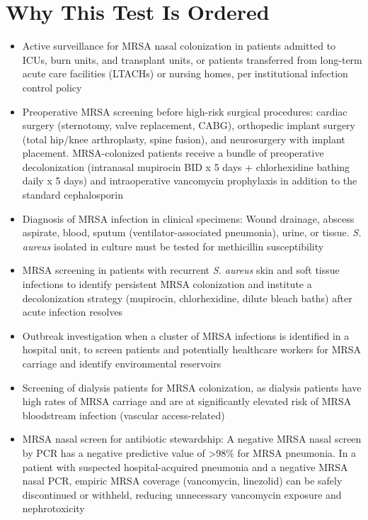 \section*{Why This Test Is Ordered}
\begin{itemize}
  \item Active surveillance for MRSA nasal colonization in patients admitted to ICUs, burn units, and transplant units, or patients transferred from long-term acute care facilities (LTACHs) or nursing homes, per institutional infection control policy
  \item Preoperative MRSA screening before high-risk surgical procedures: cardiac surgery (sternotomy, valve replacement, CABG), orthopedic implant surgery (total hip/knee arthroplasty, spine fusion), and neurosurgery with implant placement. MRSA-colonized patients receive a bundle of preoperative decolonization (intranasal mupirocin BID x 5 days + chlorhexidine bathing daily x 5 days) and intraoperative vancomycin prophylaxis in addition to the standard cephalosporin
  \item Diagnosis of MRSA infection in clinical specimens: Wound drainage, abscess aspirate, blood, sputum (ventilator-associated pneumonia), urine, or tissue. \textit{S. aureus} isolated in culture must be tested for methicillin susceptibility
  \item MRSA screening in patients with recurrent \textit{S. aureus} skin and soft tissue infections to identify persistent MRSA colonization and institute a decolonization strategy (mupirocin, chlorhexidine, dilute bleach baths) after acute infection resolves
  \item Outbreak investigation when a cluster of MRSA infections is identified in a hospital unit, to screen patients and potentially healthcare workers for MRSA carriage and identify environmental reservoirs
  \item Screening of dialysis patients for MRSA colonization, as dialysis patients have high rates of MRSA carriage and are at significantly elevated risk of MRSA bloodstream infection (vascular access-related)
  \item MRSA nasal screen for antibiotic stewardship: A negative MRSA nasal screen by PCR has a negative predictive value of >98\% for MRSA pneumonia. In a patient with suspected hospital-acquired pneumonia and a negative MRSA nasal PCR, empiric MRSA coverage (vancomycin, linezolid) can be safely discontinued or withheld, reducing unnecessary vancomycin exposure and nephrotoxicity
\end{itemize}

